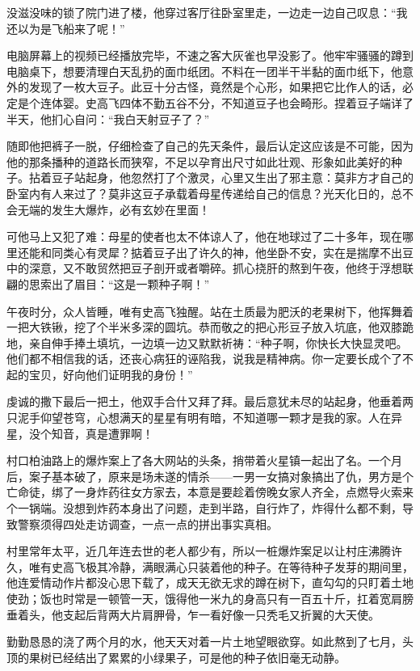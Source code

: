 没滋没味的锁了院门进了楼，他穿过客厅往卧室里走，一边走一边自己叹息：``我还以为是飞船来了呢！''

电脑屏幕上的视频已经播放完毕，不速之客大灰雀也早没影了。他牢牢骚骚的蹲到电脑桌下，想要清理白天乱扔的面巾纸团。不料在一团半干半黏的面巾纸下，他意外的发现了一枚大豆子。此豆十分古怪，竟然是个心形，如果把它比作人的话，必定是个连体婴。史高飞四体不勤五谷不分，不知道豆子也会畸形。捏着豆子端详了半天，他扪心自问：``我白天射豆子了？''

随即他把裤子一脱，仔细检查了自己的先天条件，最后认定这应该是不可能，因为他的那条播种的道路长而狭窄，不足以孕育出尺寸如此壮观、形象如此美好的种子。拈着豆子站起身，他忽然打了个激灵，心里又生出了邪主意：莫非方才自己的卧室内有人来过了？莫非这豆子承载着母星传递给自己的信息？光天化日的，总不会无端的发生大爆炸，必有玄妙在里面！

可他马上又犯了难：母星的使者也太不体谅人了，他在地球过了二十多年，现在哪里还能和同类心有灵犀？掂着豆子出了许久的神，他坐卧不安，实在是揣摩不出豆中的深意，又不敢贸然把豆子剖开或者嚼碎。抓心挠肝的熬到午夜，他终于浮想联翩的思索出了眉目：``这是一颗种子啊！''

午夜时分，众人皆睡，唯有史高飞独醒。站在土质最为肥沃的老果树下，他挥舞着一把大铁锹，挖了个半米多深的圆坑。恭而敬之的把心形豆子放入坑底，他双膝跪地，亲自伸手捧土填坑，一边填一边又默默祈祷：``种子啊，你快长大快显灵吧。他们都不相信我的话，还丧心病狂的诬陷我，说我是精神病。你一定要长成个了不起的宝贝，好向他们证明我的身份！''

虔诚的撒下最后一把土，他双手合什又拜了拜。最后意犹未尽的站起身，他垂着两只泥手仰望苍穹，心想满天的星星有明有暗，不知道哪一颗才是我的家。人在异星，没个知音，真是遭罪啊！

村口柏油路上的爆炸案上了各大网站的头条，捎带着火星镇一起出了名。一个月后，案子基本破了，原来是场未遂的情杀——一男一女搞对象搞出了仇，男方是个亡命徒，绑了一身炸药往女方家去，本意是要趁着傍晚女家人齐全，点燃导火索来个一锅端。没想到炸药本身出了问题，走到半路，自行炸了，炸得什么都不剩，导致警察须得四处走访调查，一点一点的拼出事实真相。

村里常年太平，近几年连去世的老人都少有，所以一桩爆炸案足以让村庄沸腾许久，唯有史高飞极其冷静，满眼满心只装着他的种子。在等待种子发芽的期间里，他连爱情动作片都没心思下载了，成天无欲无求的蹲在树下，直勾勾的只盯着土地使劲；饭也时常是一顿管一天，饿得他一米九的身高只有一百五十斤，扛着宽肩膀垂着头，他支起后背两大片肩胛骨，乍一看好像一只秃毛又折翼的大天使。

勤勤恳恳的浇了两个月的水，他天天对着一片土地望眼欲穿。如此熬到了七月，头顶的果树已经结出了累累的小绿果子，可是他的种子依旧毫无动静。


